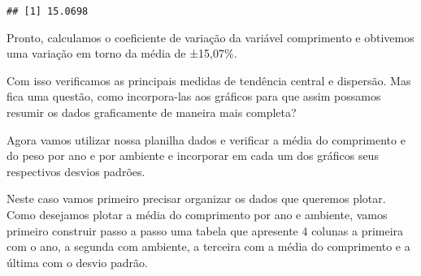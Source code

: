 \documentclass[titlepage, oneside, openany, a4paper]{book}
\begin{document}
\begin{verbatim}
## [1] 15.0698
\end{verbatim}

Pronto, calculamos o coeficiente de variação da variável comprimento e obtivemos uma variação em torno da média de ±15,07\%.

Com isso verificamos as principais medidas de tendência central e dispersão. Mas fica uma questão, como incorpora-las aos gráficos para que assim possamos resumir os dados graficamente de maneira mais completa?

Agora vamos utilizar nossa planilha dados e verificar a média do comprimento e do peso por ano e por ambiente e incorporar em cada um dos gráficos seus respectivos desvios padrões.

Neste caso vamos primeiro precisar organizar os dados que queremos plotar. Como desejamos plotar a média do comprimento por ano e ambiente, vamos primeiro construir passo a passo uma tabela que apresente 4 colunas a primeira com o ano, a segunda com ambiente, a terceira com a média do comprimento e a última com o desvio padrão.
\end{document}
